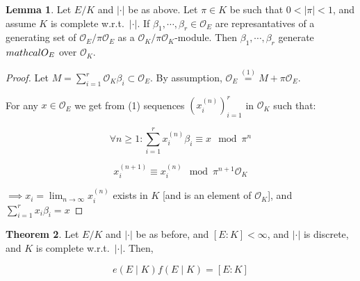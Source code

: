 \documentclass[openany]{amsbook}
\numberwithin{section}{chapter}
\theoremstyle{definition}
\newtheorem{theorem}{Theorem}[chapter]
\newtheorem{lemma}[theorem]{Lemma}
\begin{document}
\begin{lemma}
    Let \(E / K\) and \(\vert \cdot \vert\) be as above. Let \(\pi \in K\) be such that \(0 < \vert \pi \vert < 1\), and assume \(K\) is complete w.r.t.\ \(\vert \cdot \vert\). If \(\beta_1, \cdots , \beta_r \in \mathcal{O}_E\) are represantatives of a generating set of \(\mathcal{O}_E / \pi\mathcal{O} _E\) as a \(\mathcal{O}_K / \pi \mathcal{O}_K\)-module. Then \(\beta_1, \cdots, \beta_r\) generate \(\\mathcal{O}_E\) over \(\mathcal{O}_K\).
\end{lemma}

\begin{proof}
    Let \(M = \sum_{i=1}^r \mathcal{O}_K \beta_i \subset \mathcal{O}_E\). By assumption, \(\mathcal{O}_E \overset{(1)}{=} M + \pi \mathcal{O}_E\).

    For any \(x\in \mathcal{O}_E\) we get from (1) sequences \((x_i^{(n)})^r_{i=1}\) in \(\mathcal{O}_K\) such that:

    \[
        \forall n \geq 1 : \sum_{i=1}^r x_i^{(n)} \beta_i \equiv x \mod{\pi^n}
    \]

    \[
        x_i^{(n+1)} \equiv x_i^{(n)} \mod{\pi^{n+1}\mathcal{O}_K}
    \]

    \(\implies x_i = \lim_{n \to \infty} x_i^{(n)}\) exists in \(K\) [and is an element of \(\mathcal{O}_K\)], and \(\sum_{i=1}^r x_i \beta_i = x\) 
\end{proof}

\begin{theorem}
    Let \(E / K\) and \(\vert \cdot \vert\) be as before, and \([E:K] < \infty\), and \(\vert \cdot \vert\) is discrete, and \(K\) is complete w.r.t.\ \(\vert \cdot \vert\). Then,

    \[
        e(E \mid K) f(E \mid K) = [E:K]
    \]
\end{theorem}
\end{document}
